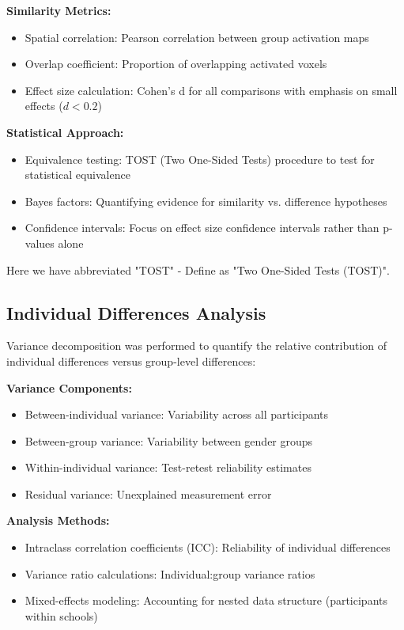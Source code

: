 \vspace{0.5\baselineskip}
\noindent
\textbf{Similarity Metrics:}
\begin{itemize}
\item Spatial correlation: Pearson correlation between group activation maps
\item Overlap coefficient: Proportion of overlapping activated voxels
\item Effect size calculation: Cohen's d for all comparisons with emphasis on small effects ($d < 0.2$)
\end{itemize}

\noindent
\textbf{Statistical Approach:}
\begin{itemize}
\item Equivalence testing: TOST (Two One-Sided Tests) procedure to test for statistical equivalence
\item Bayes factors: Quantifying evidence for similarity vs. difference hypotheses
\item Confidence intervals: Focus on effect size confidence intervals rather than p-values alone
\end{itemize}
Here we have abbreviated "TOST" - Define as "Two One-Sided Tests (TOST)".

\subsection{Individual Differences Analysis}
Variance decomposition was performed to quantify the relative contribution of individual differences versus group-level differences:

\vspace{0.5\baselineskip}
\noindent
\textbf{Variance Components:}
\begin{itemize}
\item Between-individual variance: Variability across all participants
\item Between-group variance: Variability between gender groups
\item Within-individual variance: Test-retest reliability estimates
\item Residual variance: Unexplained measurement error
\end{itemize}

\noindent
\textbf{Analysis Methods:}
\begin{itemize}
\item Intraclass correlation coefficients (ICC): Reliability of individual differences
\item Variance ratio calculations: Individual:group variance ratios
\item Mixed-effects modeling: Accounting for nested data structure (participants within schools)
\end{itemize}


